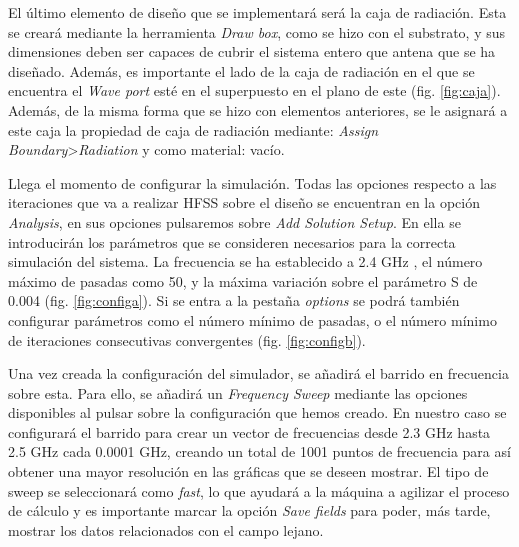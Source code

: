 \par El último elemento de diseño que se implementará será la caja de radiación. Esta se creará mediante la herramienta \textit{Draw box}, como se hizo con el substrato, y sus dimensiones deben ser capaces de cubrir el sistema entero que antena que se ha diseñado. Además, es importante el lado de la caja de radiación en el que se encuentra el \textit{Wave port} esté en el superpuesto en el plano de este (fig. \ref{fig:caja}). Además, de la misma forma que se hizo con elementos anteriores, se le asignará a este caja la propiedad de caja de radiación mediante: \textit{Assign Boundary}>\textit{Radiation} y como material: vacío.
\\
\par Llega el momento de configurar la simulación. Todas las opciones respecto a las iteraciones que va a realizar HFSS sobre el diseño se encuentran en la opción \textit{Analysis}, en sus opciones pulsaremos sobre \textit{Add Solution Setup}. En ella se introducirán los parámetros que se consideren necesarios para la correcta simulación del sistema. La frecuencia se ha establecido a 2.4 GHz , el número máximo de pasadas como 50, y la máxima variación sobre el parámetro S de 0.004 (fig. \ref{fig:configa}). Si se entra a la pestaña \textit{options} se podrá también configurar parámetros como el número mínimo de pasadas, o el número mínimo de iteraciones consecutivas convergentes (fig. \ref{fig:configb}).
\\
\par Una vez creada la configuración del simulador, se añadirá el barrido en frecuencia sobre esta. Para ello, se añadirá un \textit{Frequency Sweep} mediante las opciones disponibles al pulsar sobre la configuración que hemos creado. En nuestro caso se configurará el barrido para crear un vector de frecuencias desde 2.3 GHz hasta 2.5 GHz cada 0.0001 GHz, creando un total de 1001 puntos de frecuencia para así obtener una mayor resolución en las gráficas que se deseen mostrar. El tipo de sweep se seleccionará como \textit{fast}, lo que ayudará a la máquina a agilizar el proceso de cálculo y es importante marcar la opción \textit{Save fields} para poder, más tarde, mostrar los datos relacionados con el campo lejano.
\\

